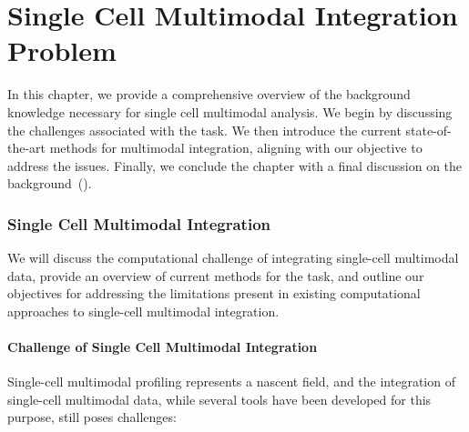 %
%
\chapter{Single Cell Multimodal Integration Problem}
\label{chapter:problem_inte}
\graphicspath{{chapter3/figs/}}

In this chapter, we provide a comprehensive overview of the background knowledge necessary for single cell multimodal analysis. We begin by discussing the challenges associated with the task. We then introduce the current state-of-the-art methods for multimodal integration, aligning with our objective to address the issues. Finally, we conclude the chapter with a final discussion on the background~().




\subsection{Single Cell Multimodal Integration}
We will discuss the computational challenge of integrating single-cell multimodal data, provide an overview of current methods for the task, and outline our objectives for addressing the limitations present in existing computational approaches to single-cell multimodal integration.

\subsubsection{Challenge of Single Cell Multimodal Integration}
\label{background:sec2:challenge_integration}
Single-cell multimodal profiling represents a nascent field, and the integration of single-cell multimodal data, while several tools have been developed for this purpose, still poses challenges:

